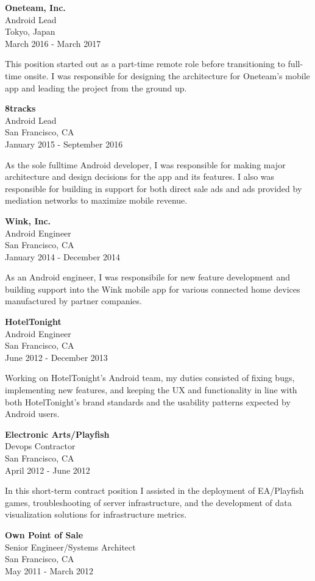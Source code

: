 \documentclass[
]{article}
\begin{document}
\textbf{Oneteam, Inc.}\\
Android Lead\\
Tokyo, Japan\\
March 2016 - March 2017

This position started out as a part-time remote role before
transitioning to full-time onsite. I was responsible for designing the
architecture for Oneteam's mobile app and leading the project from the
ground up.

\textbf{8tracks}\\
Android Lead\\
San Francisco, CA\\
January 2015 - September 2016

As the sole fulltime Android developer, I was responsible for making
major architecture and design decisions for the app and its features. I
also was responsible for building in support for both direct sale ads
and ads provided by mediation networks to maximize mobile revenue.

\textbf{Wink, Inc.}\\
Android Engineer\\
San Francisco, CA\\
January 2014 - December 2014

As an Android engineer, I was responsibile for new feature development
and building support into the Wink mobile app for various connected home
devices manufactured by partner companies.

\textbf{HotelTonight}\\
Android Engineer\\
San Francisco, CA\\
June 2012 - December 2013

Working on HotelTonight's Android team, my duties consisted of fixing
bugs, implementing new features, and keeping the UX and functionality in
line with both HotelTonight's brand standards and the usability patterns
expected by Android users.

\textbf{Electronic Arts/Playfish}\\
Devops Contractor\\
San Francisco, CA\\
April 2012 - June 2012

In this short-term contract position I assisted in the deployment of
EA/Playfish games, troubleshooting of server infrastructure, and the
development of data visualization solutions for infrastructure metrics.

\textbf{Own Point of Sale}\\
Senior Engineer/Systems Architect\\
San Francisco, CA\\
May 2011 - March 2012
\end{document}
